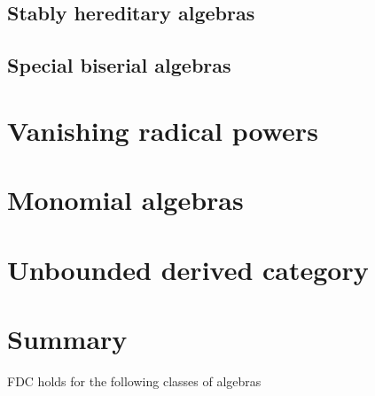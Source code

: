 \documentclass[11pt, a4paper, english]{article}
\theoremstyle{definition}
\begin{document}
\subsection{Stably hereditary algebras}


\subsection{Special biserial algebras}
\cite{EHIS04}

\section{Vanishing radical powers}


\section{Monomial algebras}\label{sec:monomial_algebras}


\section{Unbounded derived category}


\section{Summary}

FDC holds for the following classes of algebras
\end{document}
